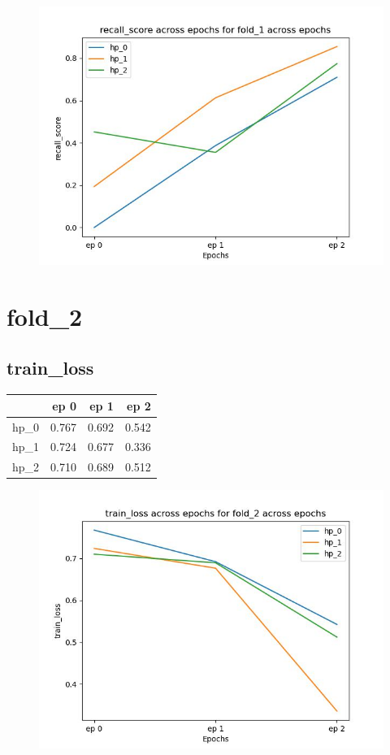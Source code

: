 \documentclass{article}
\begin{document}
\begin{figure}[H]
\includegraphics[scale = 0.75]{fold_1/recall_score}
\end{figure}
\section{fold\_2}
\subsection{train\_loss}
\begin{tabular}{lrrr}
\toprule
{} &   ep 0 &   ep 1 &   ep 2 \\
\midrule
hp\_0 &  0.767 &  0.692 &  0.542 \\
hp\_1 &  0.724 &  0.677 &  0.336 \\
hp\_2 &  0.710 &  0.689 &  0.512 \\
\bottomrule
\end{tabular}

\begin{figure}[H]
\includegraphics[scale = 0.75]{fold_2/train_loss}
\end{figure}
\end{document}
